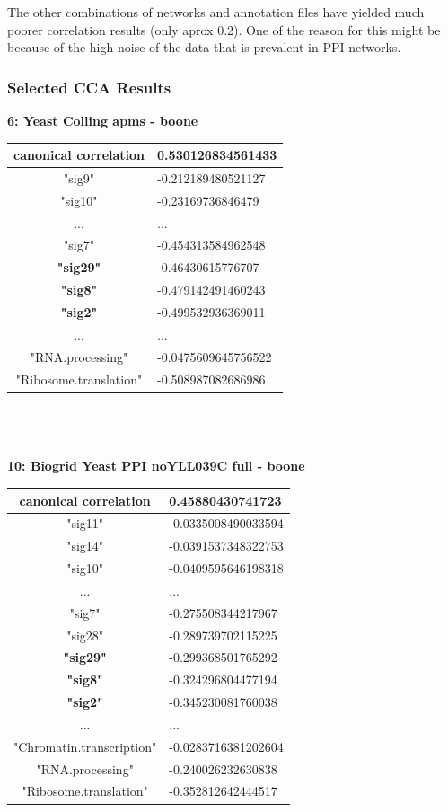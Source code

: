 \documentclass[11pt,a4paper,oneside]{report}
\begin{document}
The other combinations of networks and annotation files have yielded much poorer correlation results (only aprox 0.2). One of the reason for this might be because of the high noise of the data that is prevalent in PPI networks.

\subsubsection{Selected CCA Results}


\textbf{6: Yeast Colling apms - boone}\\

\begin{tabular}{ c | l }
canonical correlation &  0.530126834561433\\
\hline
"sig9" & -0.212189480521127\\
"sig10" & -0.23169736846479\\
... & ...\\
"sig7" & -0.454313584962548\\
\textbf{"sig29"} & -0.46430615776707\\
\textbf{"sig8"} & -0.479142491460243\\
\textbf{"sig2"} & -0.499532936369011\\
\hline
... & ...\\
"RNA.processing" & -0.0475609645756522\\
"Ribosome.translation" & -0.508987082686986\\
\end{tabular}\\\\\\

\textbf{10: Biogrid Yeast PPI noYLL039C full - boone}\\

\begin{tabular}{ c | l }
canonical correlation &  0.45880430741723\\
\hline
"sig11" & -0.0335008490033594\\
"sig14" & -0.0391537348322753\\
"sig10" & -0.0409595646198318\\
... & ...\\
"sig7" & -0.275508344217967\\
"sig28" & -0.289739702115225\\
\textbf{"sig29"} & -0.299368501765292\\
\textbf{"sig8"} & -0.324296804477194\\
\textbf{"sig2"} & -0.345230081760038\\
\hline
... & ...\\
"Chromatin.transcription" & -0.0283716381202604\\
"RNA.processing" & -0.240026232630838\\
"Ribosome.translation" & -0.352812642444517\\
\end{tabular}\\
\end{document}
